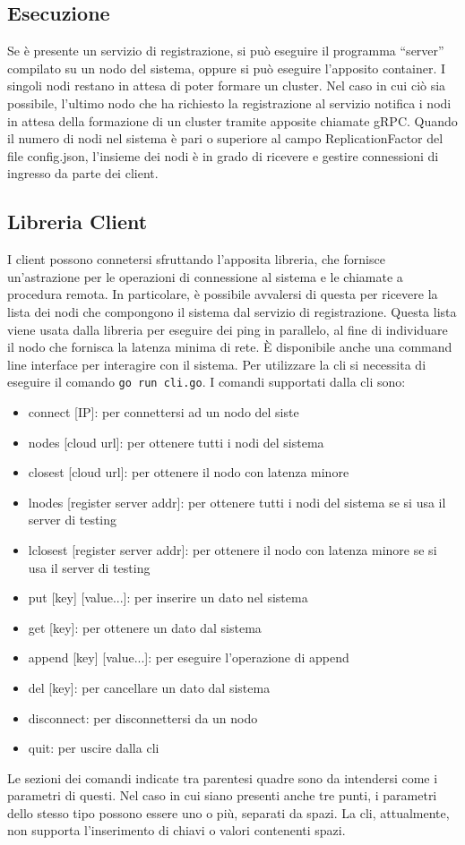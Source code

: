 \documentclass[conference]{IEEEtran}
\begin{document}
\subsection{Esecuzione}
Se è presente un servizio di registrazione, si può eseguire il programma ``server'' compilato su un nodo del sistema, oppure
si può eseguire l'apposito container. I singoli nodi restano in attesa di poter formare un cluster. Nel caso in cui ciò
sia possibile, l'ultimo nodo che ha richiesto la registrazione al servizio notifica i nodi in attesa della formazione di
un cluster tramite apposite chiamate gRPC. Quando il numero di nodi nel sistema è pari o superiore al campo ReplicationFactor
del file config.json, l'insieme dei nodi è in grado di ricevere e gestire connessioni di ingresso da parte dei client.
\subsection{Libreria Client}
I client possono connetersi sfruttando l'apposita libreria, che fornisce un'astrazione per le operazioni di connessione
al sistema e le chiamate a procedura remota. In particolare, è possibile avvalersi di questa per ricevere la lista dei
nodi che compongono il sistema dal servizio di registrazione. Questa lista viene usata dalla libreria per eseguire dei
ping in parallelo, al fine di individuare il nodo che fornisca la latenza minima di rete.
È disponibile anche una command line interface per interagire con il sistema. Per utilizzare la cli si necessita di eseguire
il comando \verb!go run cli.go!. I comandi supportati dalla cli sono:
\begin{itemize}
  \item connect [IP]: per connettersi ad un nodo del siste
  \item nodes [cloud url]: per ottenere tutti i nodi del sistema
  \item closest [cloud url]: per ottenere il nodo con latenza minore
  \item lnodes [register server addr]: per ottenere tutti i nodi del sistema se si usa il server di testing
  \item lclosest [register server addr]: per ottenere il nodo con latenza minore se si usa il server di testing
  \item put [key] [value...]: per inserire un dato nel sistema
  \item get [key]: per ottenere un dato dal sistema
  \item append [key] [value...]: per eseguire l'operazione di append
  \item del [key]: per cancellare un dato dal sistema
  \item disconnect: per disconnettersi da un nodo
  \item quit: per uscire dalla cli
\end{itemize}
Le sezioni dei comandi indicate tra parentesi quadre sono da intendersi come i parametri di questi. Nel caso in cui
siano presenti anche tre punti, i parametri dello stesso tipo possono essere uno o più, separati da spazi. La cli, attualmente, non supporta
l'inserimento di chiavi o valori contenenti spazi.

\printbibliography
\end{document}
